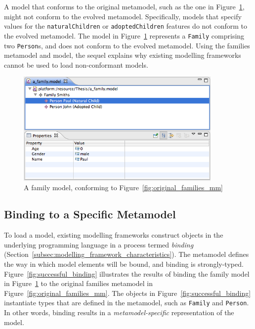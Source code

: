 A model that conforms to the original metamodel, such as the one in Figure~\ref{fig:families_model},  might not conform to the evolved metamodel. Specifically, models that specify values for the \texttt{na\-tu\-r\-alCh\-il\-dr\-en} or \texttt{ad\-op\-t\-edCh\-il\-dr\-en} features do not conform to the evolved metamodel. The model in Figure~\ref{fig:families_model} represents a \texttt{Fa\-mi\-ly} comprising two \texttt{Pe\-rs\-on}s, and does not conform to the evolved metamodel. Using the families metamodel and model, the sequel explains why existing modelling frameworks cannot be used to load non-conformant models.

\begin{figure}[htbp]
  \begin{center}
    \leavevmode
    \includegraphics[width=10cm]{5.Implementation/images/family_model.png}
  \end{center}
  \caption[A family model]{A family model, conforming to Figure~\ref{fig:original_families_mm}}
  \label{fig:families_model}
\end{figure}


\subsection{Binding to a Specific Metamodel}
\label{subsec:binding_specific}
To load a model, existing modelling frameworks construct objects in the underlying programming language in a process termed \emph{binding} (Section~\ref{subsec:modelling_framework_characteristics}). The metamodel defines the way in which model elements will be bound, and binding is strongly-typed. Figure~\ref{fig:successful_binding} illustrates the results of binding the family model in Figure~\ref{fig:families_model} to the original families metamodel in Figure~\ref{fig:original_families_mm}. The objects in Figure~\ref{fig:successful_binding} instantiate types that are defined in the metamodel, such as \texttt{Fa\-mi\-ly} and \texttt{Pe\-rs\-on}. In other words, binding results in a \emph{metamodel-specific} representation of the model.

